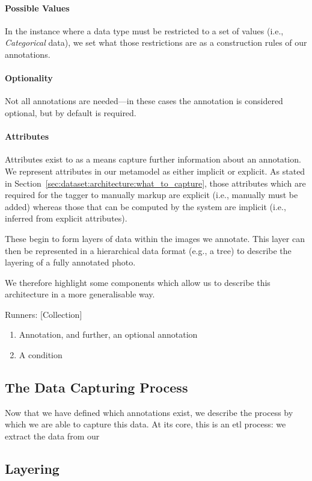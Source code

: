 \paragraph{Possible Values} In the instance where a data type must be restricted to a set of values (i.e., \textit{Categorical} data), we set what those restrictions are as a construction rules of our annotations.

\paragraph{Optionality} Not all annotations are needed---in these cases the annotation is considered optional, but by default is required.

\paragraph{Attributes} Attributes exist to as a means capture further information about an annotation. We represent attributes in our metamodel as either implicit or explicit. As stated in Section~\ref{sec:dataset:architecture:what_to_capture}, those attributes which are required for the tagger to manually markup are explicit (i.e., manually must be added) whereas those that can be computed by the system are implicit (i.e., inferred from explicit attributes).

These begin to form layers of data within the images we annotate. This layer can then be represented in a hierarchical data format (e.g., a tree) to describe the layering of a fully annotated photo. %



 We therefore highlight some components which allow us to describe this architecture in a more generalisable way.


Runners: [Collection]

\begin{enumerate}
  \item Annotation, and further, an optional annotation
  \item A condition
\end{enumerate}

\subsection{The Data Capturing Process}

Now that we have defined which annotations exist, we describe the process by which we are able to capture this data. At its core, this is an \gls{etl} process: we extract the data from our 

\subsection{Layering}



